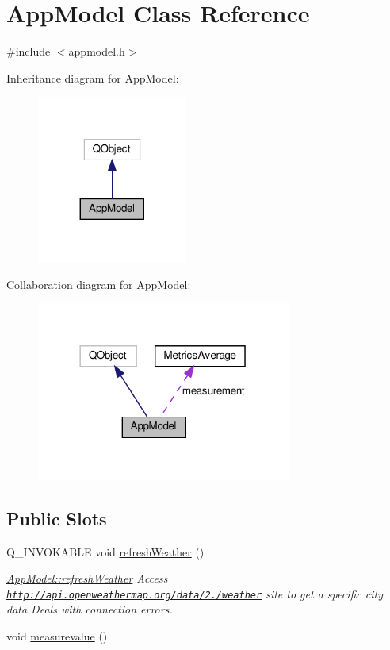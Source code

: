 \hypertarget{class_app_model}{}\section{App\+Model Class Reference}
\label{class_app_model}


{\ttfamily \#include $<$appmodel.\+h$>$}



Inheritance diagram for App\+Model\+:
\nopagebreak
\begin{figure}[H]
\begin{center}
\leavevmode
\includegraphics[width=140pt]{class_app_model__inherit__graph}
\end{center}
\end{figure}


Collaboration diagram for App\+Model\+:
\nopagebreak
\begin{figure}[H]
\begin{center}
\leavevmode
\includegraphics[width=237pt]{class_app_model__coll__graph}
\end{center}
\end{figure}
\subsection*{Public Slots}
\begin{DoxyCompactItemize}
\item 
Q\+\_\+\+I\+N\+V\+O\+K\+A\+B\+LE void \hyperlink{class_app_model_a37e1da9d028779f7f0fc908e4c04fa76}{refresh\+Weather} ()
\begin{DoxyCompactList}\small\item\em \hyperlink{class_app_model_a37e1da9d028779f7f0fc908e4c04fa76}{App\+Model\+::refresh\+Weather} Access \href{http://api.openweathermap.org/data/2.5/weather}{\tt http\+://api.\+openweathermap.\+org/data/2./weather} site to get a specific city data Deals with connection errors. \end{DoxyCompactList}\item 
void \hyperlink{class_app_model_a51e3556fa389b11c251a0a94f0a5655c}{measurevalue} ()
\end{DoxyCompactItemize}
